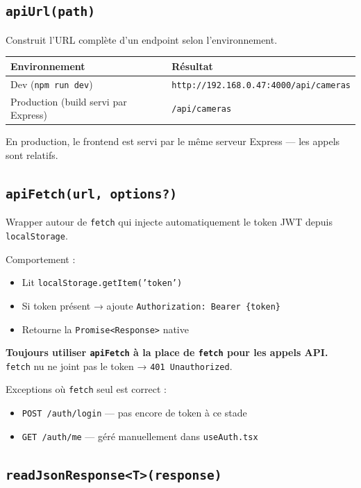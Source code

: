 \documentclass[12pt,a4paper]{article}
\begin{document}
\subsection{\texttt{apiUrl(path)}}

Construit l'URL complète d'un endpoint selon l'environnement.

\begin{longtable}{|l|l|}
\hline
\textbf{Environnement} & \textbf{Résultat} \\
\hline
\endhead
\hline
\endfoot
Dev (\texttt{npm run dev}) & \texttt{http://192.168.0.47:4000/api/cameras} \\
Production (build servi par Express) & \texttt{/api/cameras} \\
\hline
\end{longtable}

En production, le frontend est servi par le même serveur Express — les appels sont relatifs.

\subsection{\texttt{apiFetch(url, options?)}}

Wrapper autour de \texttt{fetch} qui injecte automatiquement le token JWT depuis
\texttt{localStorage}.

Comportement :
\begin{itemize}
  \item Lit \texttt{localStorage.getItem('token')}
  \item Si token présent → ajoute \texttt{Authorization: Bearer \{token\}}
  \item Retourne la \texttt{Promise<Response>} native
\end{itemize}

\textbf{Toujours utiliser \texttt{apiFetch} à la place de \texttt{fetch} pour les appels API.}
\texttt{fetch} nu ne joint pas le token → \texttt{401 Unauthorized}.

Exceptions où \texttt{fetch} seul est correct :
\begin{itemize}
  \item \texttt{POST /auth/login} — pas encore de token à ce stade
  \item \texttt{GET /auth/me} — géré manuellement dans \texttt{useAuth.tsx}
\end{itemize}

\subsection{\texttt{readJsonResponse<T>(response)}}
\end{document}

